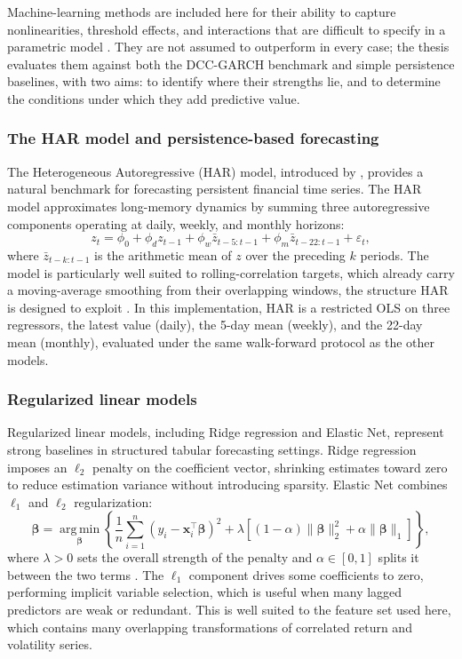 Machine-learning methods are included here for their ability to capture nonlinearities, threshold effects, and interactions that are difficult to specify in a parametric model \cite{gu2020empirical}. They are not assumed to outperform in every case; the thesis evaluates them against both the DCC-GARCH benchmark and simple persistence baselines, with two aims: to identify where their strengths lie, and to determine the conditions under which they add predictive value.

\subsubsection{The HAR model and persistence-based forecasting}

The Heterogeneous Autoregressive (HAR) model, introduced by \textcite{corsi2009har}, provides a natural benchmark for forecasting persistent financial time series. The HAR model approximates long-memory dynamics by summing three autoregressive components operating at daily, weekly, and monthly horizons:
\begin{equation}
    z_t = \phi_0 + \phi_d z_{t-1} + \phi_w \bar{z}_{t-5:t-1}
          + \phi_m \bar{z}_{t-22:t-1} + \varepsilon_t,
\end{equation}
where $\bar{z}_{t-k:t-1}$ is the arithmetic mean of $z$ over the preceding $k$ periods. The model is particularly well suited to rolling-correlation targets, which already carry a moving-average smoothing from their overlapping windows, the structure HAR is designed to exploit \cite{andersen2003realized}. In this implementation, HAR is a restricted OLS on three regressors, the latest value (daily), the 5-day mean (weekly), and the 22-day mean (monthly), evaluated under the same walk-forward protocol as the other models.

\subsubsection{Regularized linear models}

Regularized linear models, including Ridge regression and Elastic Net, represent strong baselines in structured tabular forecasting settings. Ridge regression imposes an $\ell_2$ penalty on the coefficient vector, shrinking estimates toward zero to reduce estimation variance without introducing sparsity. Elastic Net combines $\ell_1$ and $\ell_2$ regularization:
\begin{equation}
    \hat{\boldsymbol{\beta}} = \operatorname*{arg\,min}_{\boldsymbol{\beta}} \left\{
        \frac{1}{n}\sum_{i=1}^{n}(y_i - \mathbf{x}_i^{\top}\boldsymbol{\beta})^2
        + \lambda \left[(1-\alpha)\|\boldsymbol{\beta}\|_2^2 + \alpha\|\boldsymbol{\beta}\|_1\right]
    \right\},
\end{equation}
where $\lambda > 0$ sets the overall strength of the penalty and $\alpha \in [0,1]$ splits it between the two terms \cite{zou2005}. The $\ell_1$ component drives some coefficients to zero, performing implicit variable selection, which is useful when many lagged predictors are weak or redundant. This is well suited to the feature set used here, which contains many overlapping transformations of correlated return and volatility series.

